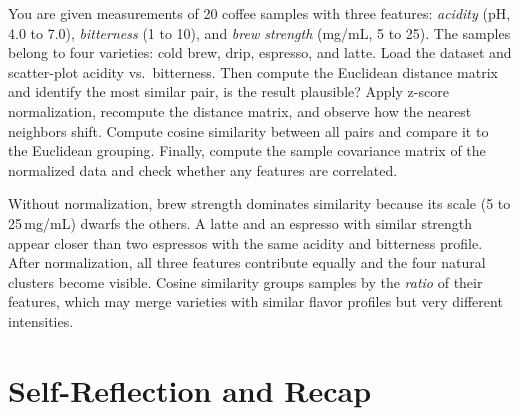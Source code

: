 

 You are given measurements of 20 coffee samples with three features:
\textit{acidity} (pH, 4.0 to 7.0), \textit{bitterness} (1 to 10), and \textit{brew strength} (mg/mL, 5 to 25).
The samples belong to four varieties: cold brew, drip, espresso, and latte.
Load the dataset and scatter-plot acidity vs.\ bitterness. Then compute the Euclidean distance matrix and identify the most similar pair, is the result plausible? Apply z-score normalization, recompute the distance matrix, and observe how the nearest neighbors shift. Compute cosine similarity between all pairs and compare it to the Euclidean grouping. Finally, compute the sample covariance matrix of the normalized data and check whether any features are correlated.

 Without normalization, brew strength dominates similarity because its scale (5 to 25\,mg/mL) dwarfs the others.
A latte and an espresso with similar strength appear closer than two espressos with the same acidity and bitterness profile.
After normalization, all three features contribute equally and the four natural clusters become visible.
Cosine similarity groups samples by the \textit{ratio} of their features, which may merge varieties with similar flavor profiles but very different intensities.





\section{Self-Reflection and Recap} 

